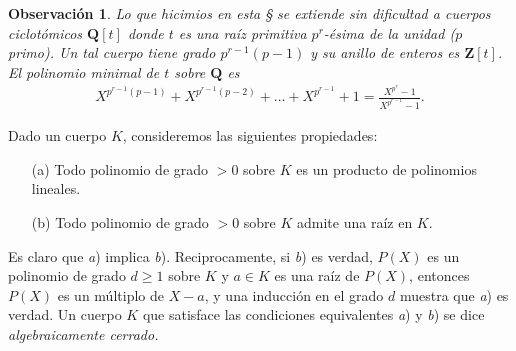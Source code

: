 \documentclass[oneside,bibtotoc,leqno,spanish]{amsbook}
\newcommand{\QQ}{\mathbf{Q}}
\newcommand{\ZZ}{\mathbf{Z}}
\numberwithin{equation}{section}
\theoremstyle{defi}
\theoremstyle{note}
\theoremstyle{rem}
\newtheorem*{remark*}{Observaci\'on}
\numberwithin{theorem}{section}
\numberwithin{proposition}{section}
\numberwithin{definition}{section}
\numberwithin{lemma}{section}
\numberwithin{corollary}{section}
\numberwithin{example}{section}
\numberwithin{footnote}{section}%
\begin{document}
\begin{remark*}
Lo que hicimios en esta \S{} se extiende sin dificultad a cuerpos ciclot\'omicos $\QQ[t]$ donde $t$ es una
ra\'iz primitiva $p^{r}$-\'esima de la unidad ($p$ primo). Un tal cuerpo tiene grado $p^{r-1}(p-1)$ y su
anillo de enteros es $\ZZ[t]$. El polinomio minimal de $t$ sobre $\QQ$ es
\begin{gather*}
X^{p^{r-1}(p-1)}+X^{p^{r-1}(p-2)}+\dots+X^{p^{r-1}}+1=\frac{X^{p^{r}}-1}{X^{p^{r-1}}-1}.
\end{gather*}
\end{remark*}

%

Dado un cuerpo $K$, consideremos las siguientes propiedades:
\begin{enumerate}
\item[(a)] Todo polinomio de grado $>0$ sobre $K$ es un producto de polinomios lineales.
\item[(b)] Todo polinomio de grado $>0$ sobre $K$ admite una ra\'iz en $K$.
\end{enumerate}
Es claro que {\itshape a}) implica {\itshape b}). Reciprocamente, si {\itshape b}) es verdad,
$P(X)$ es un polinomio de grado $d\geq 1$ sobre $K$ y $a\in K$ es una ra\'iz de $P(X)$, entonces
$P(X)$ es un m\'ultiplo de $X-a$, y una inducci\'on en el grado $d$ muestra que {\itshape a}) es verdad.
Un cuerpo $K$ que satisface las condiciones equivalentes {\itshape a}) y {\itshape b}) se dice
{\em algebraicamente cerrado.}
\end{document}
